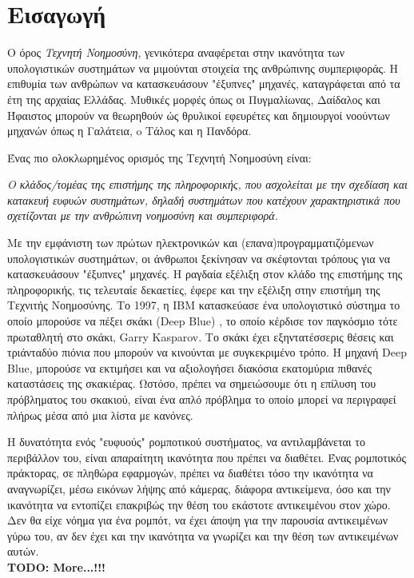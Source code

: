 \chapter{Εισαγωγή}
\label{chapter:intro}

Ο όρος \emph{Τεχνητή Νοημοσύνη}, γενικότερα αναφέρεται στην ικανότητα των υπολογιστικών
συστημάτων να μιμούνται στοιχεία της ανθρώπινης συμπεριφοράς.
Η επιθυμία των ανθρώπων να κατασκευάσουν "έξυπνες" μηχανές, καταγράφεται από
τα έτη της αρχαίας Ελλάδας. Μυθικές μορφές όπως οι Πυγμαλίωνας, Δαίδαλος και
Ήφαιστος μπορούν να θεωρηθούν ώς θρυλικοί εφευρέτες και δημιουργοί νοούντων
μηχανών όπως η Γαλάτεια, o Τάλος και η Πανδόρα.

Ένας πιο ολοκλωρημένος ορισμός της Τεχνητή Νοημοσύνη είναι:
\begin{displayquote}
\emph{
  Ο κλάδος/τομέας της επιστήμης της πληροφορικής, που ασχολείται
  με την σχεδίαση και κατακευή ευφυών συστημάτων, δηλαδή συστημάτων που
  κατέχουν χαρακτηριστικά που σχετίζονται με την ανθρώπινη νοημοσύνη και συμπεριφορά.
}
\end{displayquote}
Με την εμφάνιστη των πρώτων ηλεκτρονικών και (επανα)προγραμματιζόμενων υπολογιστικών συστημάτων,
οι άνθρωποι ξεκίνησαν να σκέφτονται τρόπους για να κατασκευάσουν "έξυπνες" μηχανές.
H ραγδαία εξέλιξη στον κλάδο της επιστήμης της πληροφορικής, τις τελευταίε
δεκαετίες, έφερε και την εξέλιξη στην επιστήμη της Τεχνιτής Νοημοσύνης.
Το 1997, η IBM κατασκεύασε ένα υπολογιστικό σύστημα το οποίο μπορούσε να
πέξει σκάκι (Deep Blue) \cite{campbell2002deep}, το οποίο κέρδισε τον παγκόσμιο
τότε πρωταθλητή στο σκάκι, Garry Kasparov. Το σκάκι έχει εξηντατέσσερις θέσεις
και τριάνταδύο πιόνια που μπορούν να κινούνται με συγκεκριμένο τρόπο. H μηχανή
Deep Blue, μπορούσε να εκτιμήσει και να αξιολογήσει διακόσια εκατομύρια
πιθανές καταστάσεις της σκακιέρας. Ωστόσο, πρέπει να σημειώσουμε ότι η επίλυση του
πρόβληματος του σκακιού, είναι ένα απλό πρόβλημα το οποίο μπορεί να περιγραφεί
πλήρως μέσα από μια λίστα με κανόνες.

Η δυνατότητα ενός "ευφυούς" ρομποτικού συστήματος, να αντιλαμβάνεται
το περιβάλλον του, είναι απαραίτητη ικανότητα που πρέπει να διαθέτει.
Ένας ρομποτικός πράκτορας, σε πληθώρα εφαρμογών, πρέπει να διαθέτει τόσο την
ικανότητα να αναγνωρίζει, μέσω εικόνων λήψης από κάμερας, διάφορα αντικείμενα,
όσο και την ικανότητα να εντοπίζει επακριβώς την θέση του
εκάστοτε αντικειμένου στον χώρο. Δεν θα είχε νόημα για ένα ρομπότ, να έχει άποψη
για την παρουσία αντικειμένων γύρω του, αν δεν έχει και την ικανότητα να γνωρίζει
και την θέση των αντικειμένων αυτών.
\\

\textbf{TODO: More...!!!}




